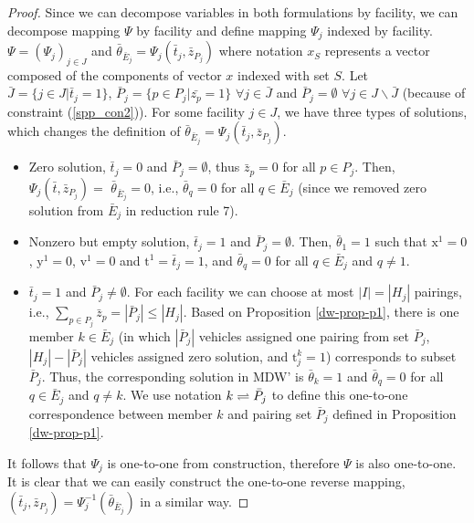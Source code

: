 \begin{proof}
  Since we can decompose variables in both formulations by facility,
  we can decompose mapping $\Psi$ by facility and define
  mapping $\Psi_j$ indexed by facility. 
  $\Psi = (\Psi_j)_{j \in J}$ and 
  $\bar{\theta}_{\bar{E}_j} = \Psi_j (\bar{t}_j, \bar{z}_{P_j})$
  where notation $x_S$ represents a vector composed of
  the components of vector $x$ indexed with set $S$. 
  Let $\bar{J}=\{j \in J | \bar{t}_j=1\}$, 
  $\bar{P}_j=\{p \in P_j | \bar{z_p}=1\}$ 
  $\forall j \in \bar{J}$ and 
  $\bar{P}_j=\emptyset$ $\forall j \in J \backslash \bar{J}$ (because
  of constraint (\ref{spp_con2})). 
  For some facility $j \in J$, we have three types of solutions, which
  changes the definition of 
  $\bar{\theta}_{\bar{E}_j} = \Psi_j(\bar{t}_j, \bar{z}_{P_j})$. %
  \begin{itemize}
  \item [i.] Zero solution, $\bar{t}_j = 0$ and $\bar{P}_j=\emptyset$, thus
    $\bar{z}_p = 0$ for all $p \in P_j$. Then, 
    $\Psi_j(\bar{t}, \bar{z}_{P_j}) =$ $\bar{\theta}_{\bar{E}_j} = 0$,
    i.e., $\bar{\theta}_q = 0$ for all $q \in \bar{E}_j$ 
    (since we removed zero solution from $\bar{E}_j$ in reduction
    rule 7).
  \item [ii.] Nonzero but empty solution, $\bar{t}_j = 1$ and 
    $\bar{P}_j=\emptyset$. Then, $\bar{\theta}_1 = 1$ such that
    $\mbox{x}^1 = 0$, $\mbox{y}^1 = 0$, $\mbox{v}^1 = 0$
    and $\mbox{t}^1 = \bar{t}_j = 1$, and $\bar{\theta}_q = 0$
    for all $q \in \bar{E}_j$ and $q \neq 1$.
  \item [iii.] $\bar{t}_j = 1$ and  $\bar{P}_j \neq \emptyset$.
    For each facility we can choose at most $|I| = |H_j|$ pairings,
    i.e., $\sum_{p \in P_j}\bar{z}_p = |\bar{P}_j| \leq |H_j|$.
    Based on Proposition \ref{dw-prop-p1}, there is one member 
    $k \in \bar{E}_j$ 
    (in which $|\bar{P}_j|$ vehicles assigned one pairing
    from set $\bar{P}_j$, $|H_j|-|\bar{P}_j|$ vehicles
    assigned zero solution, and $\mbox{t}^k_j = 1$) corresponds to 
    subset $\bar{P}_j$. Thus, the corresponding solution in MDW' is 
    $\bar{\theta}_k = 1$ and $\bar{\theta}_q = 0$ for all 
    $q \in \bar{E}_j$ and $q \neq k$. We use notation $k \rightleftharpoons \bar{P}_j$
    to define this one-to-one correspondence between member $k$ and
    pairing set $\bar{P}_j$ defined in Proposition \ref{dw-prop-p1}.
  \end{itemize} 
  It follows that  $\Psi_j$ is one-to-one from construction, therefore
  $\Psi$ is also  one-to-one. It is clear that we can easily construct 
  the one-to-one reverse mapping,  
  $(\bar{t}_j, \bar{z}_{P_j})=\Psi_j^{-1} (\bar{\theta}_{\bar{E}_j})$ in 
  a similar way. 


\end{proof}
